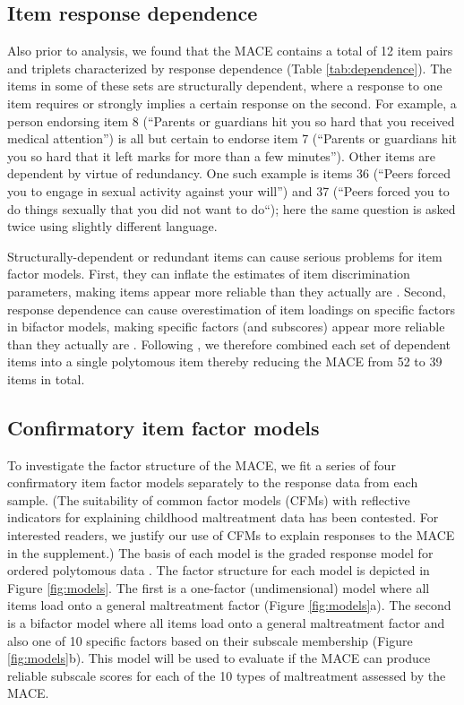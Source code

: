 \documentclass[letterpaper,man,natbib,noextraspace,floatsintext,longtable,12pt]{apa6}
\begin{document}
\subsection{Item response dependence}

Also prior to analysis, we found that the MACE contains a total of 12 item pairs and triplets characterized by response dependence (Table \ref{tab:dependence}). The items in some of these sets are structurally dependent, where a response to one item requires or strongly implies a certain response on the second. For example, a person endorsing item 8 (``Parents or guardians hit you so hard that you received medical attention'') is all but certain to endorse item 7 (``Parents or guardians hit you so hard that it left marks for more than a few minutes''). Other items are dependent by virtue of redundancy. One such example is items 36 (``Peers forced you to engage in sexual activity against your will'') and 37 (``Peers forced you to do things sexually that you did not want to do``); here the same question is asked twice using slightly different language.

Structurally-dependent or redundant items can cause serious problems for item factor models. First, they can inflate the estimates of item discrimination parameters, making items appear more reliable than they actually are \citep{marais2008formalizing}. Second, response dependence can cause overestimation of item loadings on specific factors in bifactor models, making specific factors (and subscores) appear more reliable than they actually are \citep{reise2013applying}. Following \cite{marais2008formalizing}, we therefore combined each set of dependent items into a single polytomous item thereby reducing the MACE from 52 to 39 items in total.

\subsection{Confirmatory item factor models}

To investigate the factor structure of the MACE, we fit a series of four confirmatory item factor models separately to the response data from each sample. (The suitability of common factor models (CFMs) with reflective indicators for explaining childhood maltreatment data has been contested. For interested readers, we justify our use of CFMs to explain responses to the MACE in the supplement.) The basis of each model is the graded response model for ordered polytomous data \citep{samejima1997graded}. The factor structure for each model is depicted in Figure \ref{fig:models}. The first is a one-factor (undimensional) model where all items load onto a general maltreatment factor (Figure \ref{fig:models}a). The second is a bifactor model where all items load onto a general maltreatment factor and also one of 10 specific factors based on their subscale membership (Figure \ref{fig:models}b). This model will be used to evaluate if the MACE can produce reliable subscale scores for each of the 10 types of maltreatment assessed by the MACE. 
\end{document}
